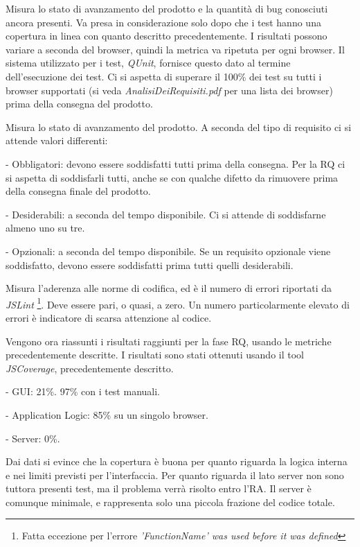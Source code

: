Misura lo stato di avanzamento del prodotto e la quantit\`a di bug conosciuti ancora presenti. Va presa in considerazione solo dopo che i test hanno una copertura in linea con quanto descritto precedentemente. I risultati possono variare a seconda del browser, quindi la metrica va ripetuta per ogni browser. Il sistema utilizzato per i test, \textit{QUnit}, fornisce questo dato al termine dell'esecuzione dei test. Ci si aspetta di superare il 100\% dei test su tutti i browser supportati (si veda \textit{AnalisiDeiRequisiti.pdf} per una lista dei browser) prima della consegna del prodotto.

Misura lo stato di avanzamento del prodotto. A seconda del tipo di requisito ci si attende valori differenti:
\begin{elencopuntato}[\subsecindent]
\item[-] Obbligatori: devono essere soddisfatti tutti prima della consegna. Per la RQ ci si aspetta di soddisfarli tutti, anche se con qualche difetto da rimuovere prima della consegna finale del prodotto.
\item[-] Desiderabili: a seconda del tempo disponibile. Ci si attende di soddisfarne almeno uno su tre.
\item[-] Opzionali: a seconda del tempo disponibile. Se un requisito opzionale viene soddisfatto, devono essere soddisfatti prima tutti quelli desiderabili.
\end{elencopuntato}

Misura l'aderenza alle norme di codifica, ed \`e il numero di errori riportati da \textit{JSLint} \footnote{Fatta eccezione per l'errore \textit{'FunctionName' was used before it was defined}}. Deve essere pari, o quasi, a zero. Un numero particolarmente elevato di errori \`e indicatore di scarsa attenzione al codice.

 

Vengono ora riassunti i risultati raggiunti per la fase RQ, usando le metriche precedentemente descritte.
I risultati sono stati ottenuti usando il tool \textit{JSCoverage}, precedentemente descritto.
\begin{elencopuntato}[\subsubsecindent]
\item[-] GUI: 21\%. 97\% con i test manuali.
\item[-] Application Logic: 85\% su un singolo browser.
\item[-] Server: 0\%.
\end{elencopuntato}
Dai dati si evince che la copertura \`e buona per quanto riguarda la logica interna e nei limiti previsti per l'interfaccia. Per quanto riguarda il lato server non sono tuttora presenti test, ma il problema verr\`a risolto entro l'RA. Il server \`e comunque minimale, e rappresenta solo una piccola frazione del codice totale.

